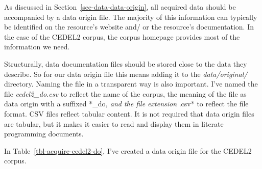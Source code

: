 \documentclass[
  letterpaper,
]{book}
\theoremstyle{definition}
\theoremstyle{remark}
\begin{document}
As discussed in Section~\ref{sec-data-data-origin}, all acquired data
should be accompanied by a data origin file. The majority of this
information can typically be identified on the resource's website and/
or the resource's documentation. In the case of the CEDEL2 corpus, the
corpus homepage provides most of the information we need.

Structurally, data documentation files should be stored close to the
data they describe. So for our data origin file this means adding it to
the \emph{data/original/} directory. Naming the file in a transparent
way is also important. I've named the file \emph{cedel2\_do.csv} to
reflect the name of the corpus, the meaning of the file as data origin
with a suffixed *\_do\emph{, and the file extension }.csv* to reflect
the file format. CSV files reflect tabular content. It is not required
that data origin files are tabular, but it makes it easier to read and
display them in literate programming documents.

In Table~\ref{tbl-acquire-cedel2-do}, I've created a data origin file
for the CEDEL2 corpus.
\end{document}
